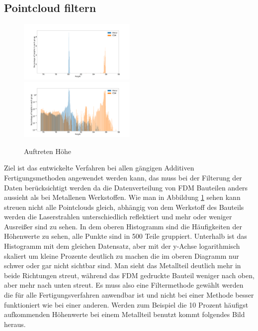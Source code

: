 \documentclass[../main.tex]{subfiles}
\begin{document}
\subsection{Pointcloud filtern}

\begin{figure}
    \centering
    \includegraphics[width=0.5\textwidth]{images/height_occurange.png}
    \includegraphics[width=0.5\textwidth]{images/height_occurange_log.png}
    \caption{Auftreten Höhe}
    \label{fig:brightness}
\end{figure}

Ziel ist das entwickelte Verfahren bei allen gängigen Additiven Fertigungsmethoden
angewendet werden kann, das muss bei der Filterung der Daten berücksichtigt werden
da die Datenverteilung von FDM Bauteilen anders aussieht als bei Metallenen Werkstoffen.
Wie man in Abbildung \ref{fig:brightness} sehen kann streuen nicht alle Pointclouds 
gleich, abhängig von dem Werkstoff des Bauteils werden die Laserstrahlen unterschiedlich
reflektiert und mehr oder weniger Ausreißer sind zu sehen. In dem oberen Histogramm 
sind die Häufigkeiten der Höhenwerte zu sehen, alle Punkte sind in 500 Teile gruppiert.
Unterhalb ist das Histogramm mit dem gleichen Datensatz, aber mit der y-Achse 
logarithmisch
skaliert um kleine Prozente deutlich zu machen die im oberen Diagramm nur schwer oder 
gar nicht sichtbar sind. Man sieht das Metallteil deutlich mehr in beide Richtungen 
streut, während das FDM gedruckte Bauteil weniger nach oben, aber mehr nach unten 
streut. Es muss also eine Filtermethode gewählt werden die für alle Fertigungsverfahren
anwendbar ist und nicht bei einer Methode besser funktioniert wie bei einer 
anderen. Werden zum Beispiel die 10 Prozent häufigst aufkommenden Höhenwerte bei einem
Metallteil benutzt kommt folgendes Bild heraus.
\end{document}
